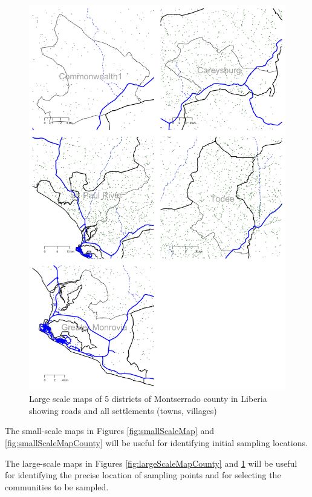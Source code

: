 \documentclass[12pt,a4paper]{book}
\theoremstyle{definition}
\theoremstyle{definition}
\theoremstyle{definition}
\theoremstyle{remark}
\begin{document}
\begin{figure}[H]

{\centering \includegraphics{figures/largeScaleMapDistricts-1} 

}

\caption{Large scale maps of 5 districts of Montserrado county in Liberia showing roads and all settlements (towns, villages)}\label{fig:largeScaleMapDistricts}
\end{figure}

\newpage

The small-scale maps in Figures \ref{fig:smallScaleMap} and
\ref{fig:smallScaleMapCounty} will be useful for identifying initial
sampling locations.

The large-scale maps in Figures \ref{fig:largeScaleMapCounty} and
\ref{fig:largeScaleMapDistricts} will be useful for identifying the
precise location of sampling points and for selecting the communities to
be sampled.
\end{document}
